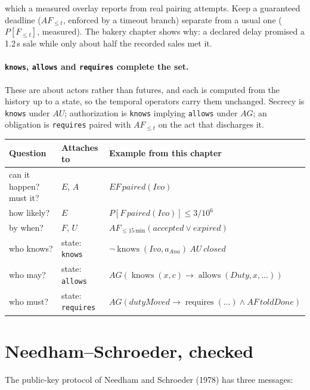 which a measured overlay reports from real pairing attempts. Keep a guaranteed
deadline ($AF_{\le t}$, enforced by a timeout branch) separate from a usual one
($P[F_{\le t}]$, measured). The bakery chapter shows why: a declared delay
promised a 1.2\,s sale while only about half the recorded sales met it.

\paragraph{\texttt{knows}, \texttt{allows} and \texttt{requires} complete the
set.} These are about actors rather than futures, and each is computed from the
history up to a state, so the temporal operators carry them unchanged. Secrecy is
\texttt{knows} under $AU$; authorization is \texttt{knows} implying
\texttt{allows} under $AG$; an obligation is \texttt{requires} paired with
$AF_{\le t}$ on the act that discharges it.

\begin{center}
\begin{tabular}{@{}p{}p{}p{}@{}}
\toprule
Question & Attaches to & Example from this chapter \\
\midrule
can it happen? must it? & $E$, $A$ & $EF\,\mathit{paired}(\mathit{Ivo})$ \\
how likely? & $E$ & $P[F\,\mathit{paired}(\mathit{Ivo})] \le 3/10^6$ \\
by when? & $F$, $U$ & $AF_{\le 15\,\mathrm{min}}(\mathit{accepted} \lor \mathit{expired})$ \\
who knows? & state: \texttt{knows} & $\neg\operatorname{knows}(\mathit{Ivo},a_{\mathit{Ana}})\ AU\ \mathit{closed}$ \\
who may? & state: \texttt{allows} & $AG(\operatorname{knows}(x,c)\rightarrow\operatorname{allows}(\mathit{Duty},x,\ldots))$ \\
who must? & state: \texttt{requires} & $AG(\mathit{dutyMoved}\rightarrow\operatorname{requires}(\ldots)\land AF\,\mathit{toldDone})$ \\
\bottomrule
\end{tabular}
\end{center}

\section{Needham--Schroeder, checked}
\label{sec:needham-schroeder}

The public-key protocol of Needham and Schroeder (1978) has three messages:

